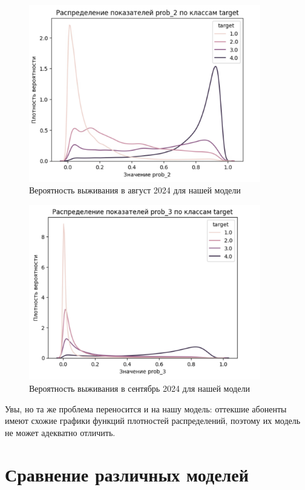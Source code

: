 \documentclass[a4paper,14pt,oneside,openany]{memoir}
\begin{document}
\begin{figure}[H]
	\includegraphics[width=0.9\textwidth]{../figures/prob_2_our.png}
	\caption{Вероятность выживания в август 2024 для нашей модели}
\end{figure}

\begin{figure}[H]
	\includegraphics[width=0.9\textwidth]{../figures/prob_3_our.png}
	\caption{Вероятность выживания в сентябрь 2024 для нашей модели}
\end{figure}

Увы, но та же проблема переносится и на нашу модель: оттекшие абоненты имеют схожие графики функций плотностей распределений, поэтому их модель не может адекватно отличить. 



\section{Сравнение различных моделей}
\end{document}
